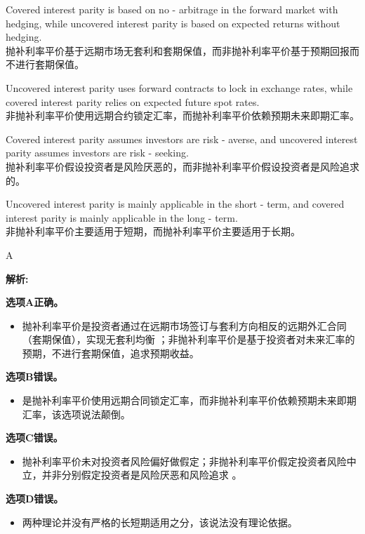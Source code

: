 \documentclass{article}
\newenvironment{explanation}
{\textbf{解析:}\par}
{\par}
\begin{document}
    \begin{choices}
        \item Covered interest parity is based on no - arbitrage in the forward market with hedging, while uncovered interest parity is based on expected returns without hedging.\\
        抛补利率平价基于远期市场无套利和套期保值，而非抛补利率平价基于预期回报而不进行套期保值。
        \item Uncovered interest parity uses forward contracts to lock in exchange rates, while covered interest parity relies on expected future spot rates.\\
        非抛补利率平价使用远期合约锁定汇率，而抛补利率平价依赖预期未来即期汇率。
        \item Covered interest parity assumes investors are risk - averse, and uncovered interest parity assumes investors are risk - seeking.\\
        抛补利率平价假设投资者是风险厌恶的，而非抛补利率平价假设投资者是风险追求的。
        \item Uncovered interest parity is mainly applicable in the short - term, and covered interest parity is mainly applicable in the long - term.\\
        非抛补利率平价主要适用于短期，而抛补利率平价主要适用于长期。
    \end{choices}
    
    \begin{correctanswer}
    A
    \end{correctanswer}
    
    \begin{explanation}
    \textbf{选项A正确。}
    \begin{itemize}
    \item 抛补利率平价是投资者通过在远期市场签订与套利方向相反的远期外汇合同（套期保值），实现无套利均衡 ；非抛补利率平价是基于投资者对未来汇率的预期，不进行套期保值，追求预期收益。
    \end{itemize}
    \textbf{选项B错误。}
    \begin{itemize}
    \item 是抛补利率平价使用远期合同锁定汇率，而非抛补利率平价依赖预期未来即期汇率，该选项说法颠倒。
    \end{itemize}
    \textbf{选项C错误。}
    \begin{itemize}
    \item 抛补利率平价未对投资者风险偏好做假定；非抛补利率平价假定投资者风险中立，并非分别假定投资者是风险厌恶和风险追求 。
    \end{itemize}
    \textbf{选项D错误。}
    \begin{itemize}
    \item 两种理论并没有严格的长短期适用之分，该说法没有理论依据。 
    \end{itemize}
    \end{explanation}
    
\end{document}

